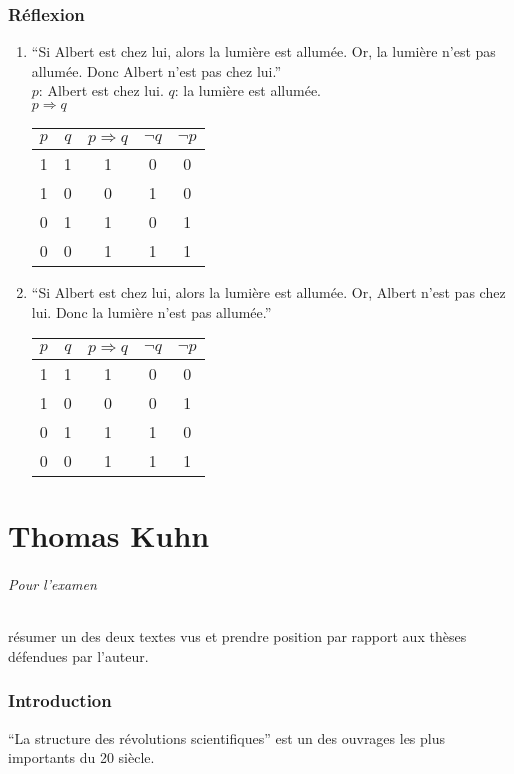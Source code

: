 \section{Réflexion}
\begin{enumerate}
	\item ``Si Albert est chez lui, alors la lumière est allumée. Or, la lumière n'est pas allumée. Donc Albert n'est pas chez lui.''\\
		$p$: Albert est chez lui. $q$: la lumière est allumée.\\
		$p\Rightarrow q$
		\begin{center}
			\begin{tabular}{|c|c||c|c|c|}
				\hline
				$p$&$q$& $p\Rightarrow q$&$\lnot q$&$\lnot p$\\
				\hline
				1&1&1&0&0\\
				\hline
				1&0&0&1&0\\
				\hline
				0&1&1&0&1\\
				\hline
				0&0&1&1&1\\
				\hline
			\end{tabular}
		\end{center}
	\item ``Si Albert est chez lui, alors la lumière est allumée. Or, Albert n'est pas chez lui. Donc la lumière n'est pas allumée.''
		\begin{center}
			\begin{tabular}{|c|c||c|c|c|}
				\hline
				$p$&$q$& $p\Rightarrow q$&$\lnot q$&$\lnot p$\\
				\hline
				1&1&1&0&0\\
				\hline
				1&0&0&0&1\\
				\hline
				0&1&1&1&0\\
				\hline
				0&0&1&1&1\\
				\hline
			\end{tabular}
		\end{center}
\end{enumerate}
\part{Thomas Kuhn}
\paragraph{Pour l'examen}
résumer un des deux textes vus et prendre position par rapport aux thèses défendues par l'auteur.

\section{Introduction}
``La structure des révolutions scientifiques'' est un des ouvrages les plus importants du 20\ieme{} siècle.


